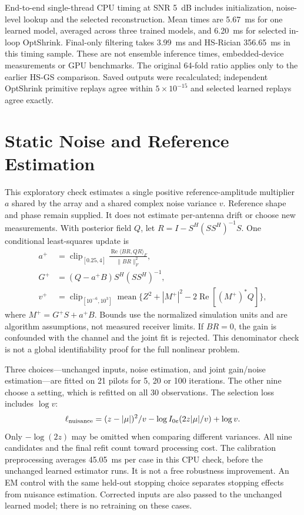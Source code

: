 End-to-end single-thread CPU timing at SNR 5~dB includes initialization,
noise-level lookup and the selected reconstruction. Mean times are 5.67~ms
for one learned model, averaged across three trained models, and 6.20~ms
for selected in-loop OptShrink. Final-only filtering takes 3.99~ms and
HS-Rician 356.65~ms in this timing sample. These are not ensemble inference
times, embedded-device measurements or GPU benchmarks. The original
64-fold ratio applies only to the earlier HS-GS comparison. Saved outputs
were recalculated; independent OptShrink primitive replays agree within
$5\times10^{-15}$ and selected learned replays agree exactly.

\section{Static Noise and Reference Estimation}
This exploratory check estimates a single positive reference-amplitude
multiplier $a$ shared by the array and a shared complex noise variance
$v$. Reference shape and phase remain supplied. It does not estimate
per-antenna drift or choose new measurements. With posterior field $Q$,
let $R=I-S^H(SS^H)^{-1}S$. One conditional least-squares update is
\begin{align}
 a^+&=\operatorname{clip}_{[0.25,4]}
       \frac{\operatorname{Re}\langle BR,QR\rangle_F}{\|BR\|_F^2},\\
 G^+&=(Q-a^+B)S^H(SS^H)^{-1},\\
 v^+&=\operatorname{clip}_{[10^{-6},10^3]}
       \operatorname{mean}\{Z^2+|M^+|^2-2\operatorname{Re}[(M^+)^*Q]\},
\end{align}
where $M^+=G^+S+a^+B$. Bounds use the normalized simulation units and
are algorithm assumptions, not measured receiver limits. If $BR=0$,
the gain is confounded with the channel and the joint fit is rejected.
This denominator check is not a global identifiability proof for the
full nonlinear problem.

Three choices---unchanged inputs, noise estimation, and joint gain/noise
estimation---are fitted on 21 pilots for 5, 20 or 100 iterations.
The other nine choose a setting, which is refitted on all 30 observations.
The selection loss includes $\log v$:
\begin{equation}
 \ell_{\rm nuisance}=(z-|\mu|)^2/v-\log I_{0e}(2z|\mu|/v)+\log v.
\end{equation}
Only $-\log(2z)$ may be omitted when comparing different variances.
All nine candidates and the final refit count toward processing cost.
The calibration preprocessing averages 45.05~ms per case in this CPU
check, before the unchanged learned estimator runs. It is not a free
robustness improvement.
An EM control with the same held-out stopping choice separates stopping
effects from nuisance estimation. Corrected inputs are also passed to
the unchanged learned model; there is no retraining on these cases.

